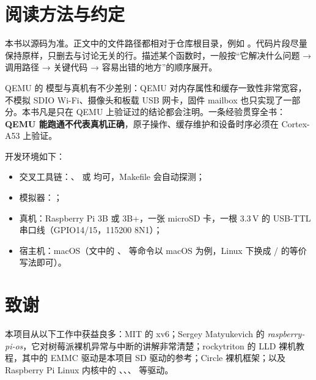 \section{阅读方法与约定}

本书以源码为准。正文中的文件路径都相对于仓库根目录，例如 。代码片段尽量保持原样，只删去与讨论无关的行。描述某个函数时，一般按“它解决什么问题 → 调用路径 → 关键代码 → 容易出错的地方”的顺序展开。

\begin{note}
  QEMU 的  模型与真机有不少差别：QEMU 对内存属性和缓存一致性非常宽容，不模拟 SDIO Wi-Fi、摄像头和板载 USB 网卡，固件 mailbox 也只实现了一部分。本书凡是只在 QEMU 上验证过的结论都会注明。一条经验贯穿全书：\textbf{QEMU 能跑通不代表真机正确}，原子操作、缓存维护和设备时序必须在 Cortex-A53 上验证。
\end{note}

开发环境如下：

\begin{itemize}
  \item 交叉工具链：、 或  均可，Makefile 会自动探测；
  \item 模拟器：；
  \item 真机：Raspberry Pi 3B 或 3B+，一张 microSD 卡，一根 3.3\,V 的 USB-TTL 串口线（GPIO14/15，115200 8N1）；
  \item 宿主机：macOS（文中的 、 等命令以 macOS 为例，Linux 下换成 / 的等价写法即可）。
\end{itemize}

\section{致谢}

本项目从以下工作中获益良多：MIT 的 xv6\cite{xv6book}；Sergey Matyukevich 的 \emph{raspberry-pi-os}\cite{rpios}，它对树莓派裸机异常与中断的讲解非常清楚；rockytriton 的 LLD 裸机教程\cite{lld}，其中的 EMMC 驱动是本项目 SD 驱动的参考；Circle 裸机框架\cite{circle}；以及 Raspberry Pi Linux 内核中的 、、、 等驱动\cite{rpilinux}。
